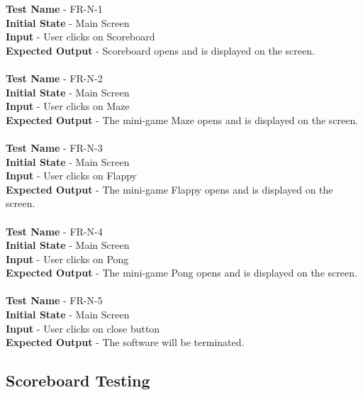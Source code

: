 \documentclass[12pt, titlepage]{article}
\begin{document}
\textbf{Test Name} - FR-N-1\\
\textbf{Initial State} - Main Screen\\
\textbf{Input} - User clicks on Scoreboard\\
\textbf{Expected Output} - Scoreboard opens and is displayed on the screen.\\ \\
\textbf{Test Name} - FR-N-2\\
\textbf{Initial State} - Main Screen\\
\textbf{Input} - User clicks on Maze\\
\textbf{Expected Output} - The mini-game Maze opens and is displayed on the screen.\\ \\
\textbf{Test Name} - FR-N-3\\
\textbf{Initial State} - Main Screen\\
\textbf{Input} - User clicks on Flappy\\
\textbf{Expected Output} - The mini-game Flappy opens and is displayed on the screen.\\ \\
\textbf{Test Name} - FR-N-4\\
\textbf{Initial State} - Main Screen\\
\textbf{Input} - User clicks on Pong\\
\textbf{Expected Output} - The mini-game Pong opens and is displayed on the screen.\\ \\
\textbf{Test Name} - FR-N-5\\
\textbf{Initial State} - Main Screen\\
\textbf{Input} - User clicks on close button\\
\textbf{Expected Output} - The software will be terminated. \\

\subsection{Scoreboard Testing}
\end{document}
